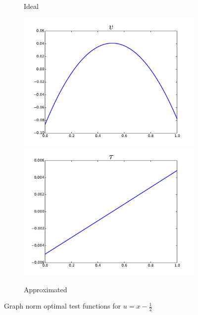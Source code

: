 \documentclass{article}
\theoremstyle{definition}
\theoremstyle{remark}
\begin{document}
\begin{figure}[ht]
\begin{subfigure}[t]{0.4\textwidth}
\caption{Ideal}
\label{fig:idealGraph}
\end{subfigure}
\begin{subfigure}[t]{0.4\textwidth}
\centering
\includegraphics[width=\textwidth]{OptimalTestFunctions/uLinear_1e-2/steady/graph_steady_v_approx3}\\
\includegraphics[width=\textwidth]{OptimalTestFunctions/uLinear_1e-2/steady/graph_steady_tau_approx3}\\
\caption{Approximated}
\label{fig:approxGraph}
\end{subfigure}
\caption{Graph norm optimal test functions for $u=x-\frac{1}{2}$}
\label{fig:optimalGraph}
\end{figure}
\end{document}
